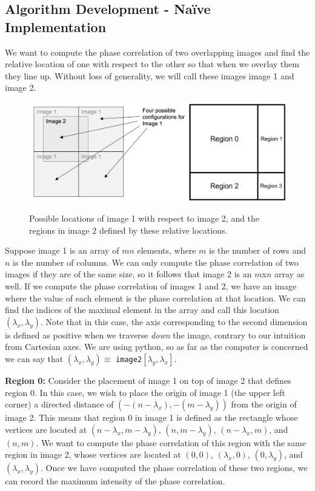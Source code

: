 \documentclass[]{article}
\begin{document}
\subsection{Algorithm Development - Na\"ive Implementation}
\label{alg_dev_peak}
We want to compute the phase correlation of two overlapping images and find the relative location of one with respect to the other so that when we overlay them they line up. Without loss of generality, we will call these images image 1 and image 2.
\begin{figure}[H]
	\centering
	\includegraphics[width=6.75in]{images/region.png}
	\label{regions}
	\caption{Possible locations of image 1 with respect to image 2, and the regions in image 2 defined by these relative locations.}
\end{figure}
Suppose image 1 is an array of $mn$ elements, where $m$ is the number of rows and $n$ is the number of columns. We can only compute the phase correlation of two images if they are of the same size, so it follows that image 2 is an $m$x$n$ array as well. If we compute the phase correlation of images 1 and 2, we have an image where the value of each element is the phase correlation at that location. We can find the indices of the maximal element in the array and call this location $(\lambda _x, \lambda _y)$. Note that in this case, the axis corresponding to the second dimension is defined as positive when we traverse \emph{down} the image, contrary to our intuition from Cartesian axes. We are using python, so as far as the computer is concerned we can say that $(\lambda _x, \lambda _y)\equiv$ \texttt{image2}$[\lambda _y,\lambda _x]$.

\vskip 5pt

\textbf{Region 0:} Consider the placement of image 1 on top of image 2 that defines region 0. In this case, we wish to place the origin of image 1 (the upper left corner) a directed distance of $(-{(n-\lambda _x)},-{(m-\lambda _y)})$ from the origin of image 2. This means that region 0 in image 1 is defined as the rectangle whose vertices are located at $(n-\lambda _x,m-\lambda _y)$, $(n,m-\lambda _y)$, $(n-\lambda_x,m)$, and $(n,m)$. We want to compute the phase correlation of this region with the same region in image 2, whose vertices are located at $(0,0)$, $(\lambda_x,0)$, $(0,\lambda_y)$, and $(\lambda_x,\lambda_y)$. Once we have computed the phase correlation of these two regions, we can record the maximum intensity of the phase correlation.
\end{document}
